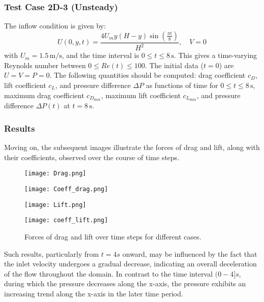 \documentclass{article}
\begin{document}
    
\subsubsection{Test Case 2D-3 (Unsteady)}

The inflow condition is given by:
\[
U(0, y, t) = \frac{4U_m y (H - y) \sin\left(\frac{\pi t}{8}\right)}{H^2}, \quad V = 0
\]
with \(U_m = 1.5 \, \text{m/s}\), and the time interval is \(0 \leq t \leq 8 \, \text{s}\). This gives a time-varying Reynolds number between \(0 \leq Re(t) \leq 100\). The initial data (\(t = 0\)) are \(U = V = P = 0\). The following quantities should be computed: drag coefficient \(c_D\), lift coefficient \(c_L\), and pressure difference \(\Delta P\) as functions of time for \(0 \leq t \leq 8 \, \text{s}\), maximum drag coefficient \(c_{D_{\text{max}}}\), maximum lift coefficient \(c_{L_{\text{max}}}\), and pressure difference \(\Delta P(t)\) at \(t = 8 \, \text{s}\).


\subsubsection*{Results}


Moving on, the subsequent images illustrate the forces of drag and lift, along with their coefficients, observed over the course of time steps.

\begin{figure}[h]
    \centering
    \begin{minipage}{0.48\textwidth}
        \centering
        \texttt{[image: Drag.png]}
    \end{minipage}\hfill
    \begin{minipage}{0.48\textwidth}
        \centering
        \texttt{[image: Coeff\_drag.png]}
    \end{minipage}

    \begin{minipage}{0.48\textwidth}
        \centering
        \texttt{[image: Lift.png]}
    \end{minipage}\hfill
    \begin{minipage}{0.48\textwidth}
        \centering
        \texttt{[image: coeff\_lift.png]}
    \end{minipage}

    \caption{Forces of drag and lift over time steps for different cases.}
\end{figure}
Such results, particularly from \(t = 4s\) onward, may be influenced by the fact that the inlet velocity undergoes a gradual decrease, indicating an overall deceleration of the flow throughout the domain. In contrast to the time interval \((0-4]s\), during which the pressure decreases along the x-axis, the pressure exhibits an increasing trend along the x-axis in the later time period. 
\end{document}
